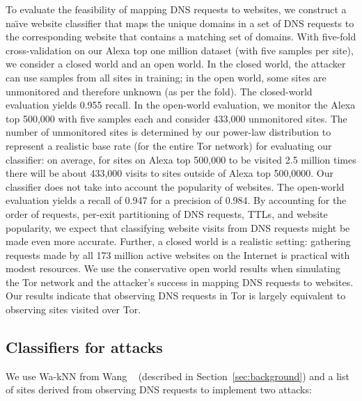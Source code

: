 To evaluate the feasibility of mapping DNS requests to websites, we
construct a na\"{\i}ve website classifier that maps the unique domains
in a set of DNS requests to the corresponding website that contains a
matching set of domains.  With five-fold cross-validation on our Alexa
top one million dataset (with five samples per site),
we consider a closed world and an open world.
In the closed world, the attacker can use samples
from all sites in training; in the open world, some sites
are unmonitored and therefore unknown (as per the fold).  The
closed-world evaluation yields 0.955 recall.  In the open-world
evaluation, we monitor the Alexa top 500,000 with five samples each and
consider 433,000 unmonitored sites.  The number of unmonitored sites is
determined by our power-law
distribution to represent a realistic base rate (for the entire Tor network)
for evaluating our classifier: on average, for sites on Alexa top 500,000
to be visited 2.5 million times there will be about 433,000 visits to sites
outside of Alexa top 500,0000.  Our classifier does not take into account the
popularity of websites.
The open-world evaluation yields a
recall of 0.947 for a precision of 0.984.  By accounting for the order
of requests, per-exit partitioning of DNS requests, TTLs, and website
popularity, we expect that classifying website visits from DNS requests
might be made even more accurate.
Further, a closed world is a realistic setting:
gathering requests made by all 173 million active websites on the
Internet is practical with modest resources.
We use the conservative open world results when simulating the Tor network and
the attacker's success in mapping DNS requests to websites.
Our results indicate that observing DNS requests in Tor is
largely equivalent to observing sites visited over Tor.

\subsection{Classifiers for \name attacks}

We use Wa-kNN from Wang \ea~\cite{Wang2014a} (described in
Section~\ref{sec:background}) and a list of sites derived from
observing DNS requests to implement two \name attacks:


